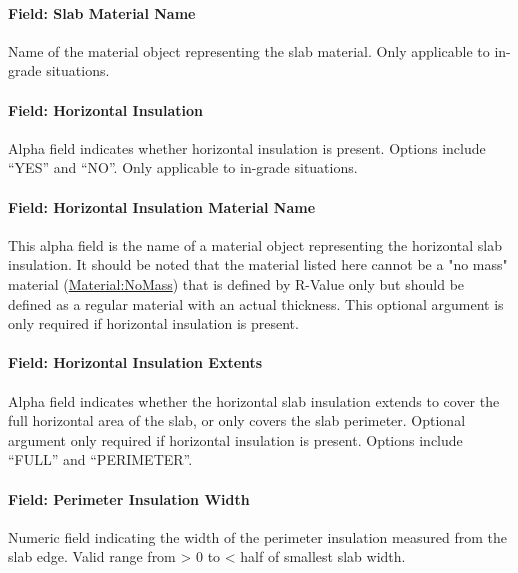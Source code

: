 \paragraph{Field: Slab Material Name}\label{field-slab-material-name}

Name of the material object representing the slab material. Only applicable to in-grade situations.

\paragraph{Field: Horizontal Insulation}\label{field-horizontal-insulation}

Alpha field indicates whether horizontal insulation is present. Options include ``YES'' and ``NO''. Only applicable to in-grade situations.

\paragraph{Field: Horizontal Insulation Material Name}\label{field-horizontal-insulation-material-name}

This alpha field is the name of a material object representing the horizontal slab insulation. It should be noted that the material listed here cannot be a "no mass" material (\hyperref[materialnomass]{Material:NoMass}) that is defined by R-Value only but should be defined as a regular material with an actual thickness. This optional argument is only required if horizontal insulation is present.

\paragraph{Field: Horizontal Insulation Extents}\label{field-horizontal-insulation-extents}

Alpha field indicates whether the horizontal slab insulation extends to cover the full horizontal area of the slab, or only covers the slab perimeter. Optional argument only required if horizontal insulation is present. Options include ``FULL'' and ``PERIMETER''.

\paragraph{Field: Perimeter Insulation Width}\label{field-perimeter-insulation-width}

Numeric field indicating the width of the perimeter insulation measured from the slab edge. Valid range from \textgreater{} 0 to \textless{} half of smallest slab width.


